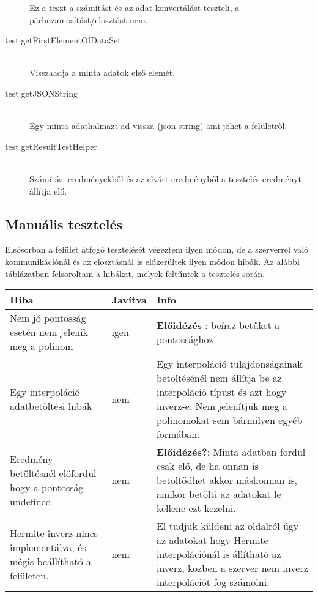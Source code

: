 \begin{description}
			Ez a teszt a számítást és az adat konvertálást teszteli, a párhuzamosítást/elosztást nem.
		\item[test:getFirstElementOfDataSet] \hfill \\
			Visszaadja a minta adatok első elemét.
		\item[test:getJSONString] \hfill \\
			Egy minta adathalmazt ad vissza (json string) ami jöhet a felületről.
		\item[test:getResultTestHelper] \hfill \\
			Számítási eredményekből és az elvárt eredményből a tesztelés eredményt állítja elő. 
	\end{description}

\subsection{Manuális tesztelés}
	Elsősorban a felület átfogó tesztelését végeztem ilyen módon, de a szerverrel való kommunikációnál és az elosztásnál is előkerültek ilyen módon hibák. \newline
	Az alábbi táblázatban felsoroltam a hibákat, melyek feltűntek a tesztelés során. 
	\begin{center}
  	\begin{tabular}{| p{4cm} | p{1.5cm} | p{8cm} |}
    \hline
    Hiba & Javítva & Info
  	\\ \hline
        Nem jó pontosság esetén nem jelenik meg a polinom
      &
      	igen
      &
		\textbf{Előidézés} : beírsz betűket a pontossághoz 
    \\ \hline
        Egy interpoláció adatbetöltési hibák
      &
      	nem
      &
      	Egy interpoláció tulajdonságainak betöltésénél nem állítja be az interpoláció típust és azt hogy inverz-e.
      	Nem jelenítjük meg a polinomokat sem bármilyen egyéb formában.
    \\ \hline
        Eredmény betöltésnél előfordul hogy a pontosság undefined 
      &
      	nem
      &
		\textbf{Előidézés?}:  Minta adatban fordul csak elő, de ha onnan  is betöltődhet akkor máshonnan is, amikor betölti az adatokat le kellene ezt kezelni.
    \\ \hline
    	Hermite inverz nincs implementálva, és mégis beállítható a felületen.  
      &
      	nem
      &
		El tudjuk küldeni az oldalról úgy az adatokat hogy Hermite interpolációnál is állítható az inverz, közben a szerver nem inverz interpolációt fog számolni.
	\\ \hline
  \end{tabular}\end{center}
